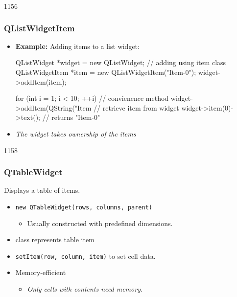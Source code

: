 \begin{slide}[fragile]{1156}\frametitle{QListWidgetItem}

  \begin{itemize}
  \item \textbf{Example:} Adding items to a list widget:
 \begin{cpp}
QListWidget *widget = new QListWidget;
// adding using item class
QListWidgetItem *item = new QListWidgetItem("Item-0");
widget->addItem(item);

for (int i = 1; i < 10; ++i) {
  // convienence method
  widget->addItem(QString("Item %
}
// retrieve item from widget
widget->item(0)->text(); // returns "Item-0"
  \end{cpp}
 \item \textit{The widget takes ownership of the items}
\end{itemize}
\end{slide}

\begin{slide}{1158}\frametitle{QTableWidget}

Displays a table of items.

\begin{itemize}
\item \texttt{new QTableWidget(rows, columns, parent)}
  \begin{itemize}
  \item Usually constructed with predefined dimensions.
  \end{itemize}
\item class  represents table item
\item \texttt{setItem(row, column, item)} to set cell data.
\item Memory-efficient
  \begin{itemize}
  \item \textit{ Only cells with contents need memory.}
  \end{itemize}
\end{itemize}

\vspace*{0.5em}

\end{slide}


